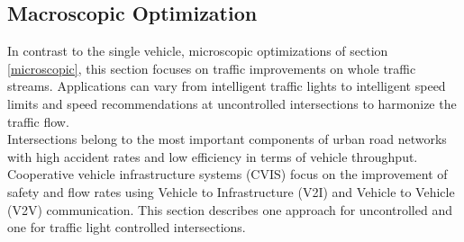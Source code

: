 \documentclass{sig-alternate}
\begin{document}
\subsection{Macroscopic Optimization}
\label{macroscopic}
In contrast to the single vehicle, microscopic optimizations of section \ref{microscopic}, this section focuses on traffic improvements on whole traffic streams.
Applications can vary from intelligent traffic lights to intelligent speed limits and speed recommendations at uncontrolled intersections to harmonize the traffic flow. \\
Intersections belong to the most important components of urban road networks with high accident rates and low efficiency in terms of vehicle throughput. Cooperative vehicle infrastructure systems (CVIS) focus on the improvement of safety and flow rates using Vehicle to Infrastructure (V2I) and Vehicle to Vehicle (V2V) communication. This section describes one approach for uncontrolled and one for traffic light controlled intersections. \\
\end{document}
